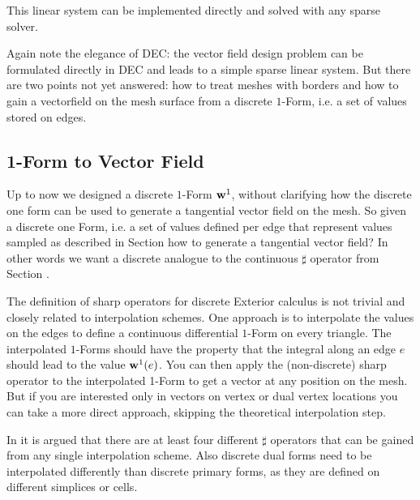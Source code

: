 This linear system can be implemented directly and solved with any sparse solver.

Again note the elegance of DEC: the vector field design problem can be formulated directly in DEC and leads to a simple sparse linear system. But there are two points not yet answered: how to treat meshes with borders and how to gain a vectorfield on the mesh surface from a discrete $1$-Form, i.e. a set of values stored on edges.

\subsection{1-Form to Vector Field}
Up to now we designed a discrete $1$-Form $\textbf{w}^1$, without clarifying how the discrete one form can be used to generate a tangential vector field on the mesh. So given a discrete one Form, i.e. a set of values defined per edge that represent values sampled as described in Section   how to generate a tangential vector field? In other words we want a discrete analogue to the continuous $\sharp$ operator from Section .

The definition of sharp operators for discrete Exterior calculus is not trivial and closely related to interpolation schemes. One approach is to interpolate the values on the edges to define a continuous differential $1$-Form on every triangle. The interpolated $1$-Forms should have the property that the integral along an edge $e$ should lead to the value $\textbf{w}^1(e)$. You can then apply the (non-discrete) sharp operator to the interpolated 1-Form to get a vector at any position on the mesh.
But if you are interested only in vectors on vertex or dual vertex locations you can take a more direct approach, skipping the theoretical interpolation step.

In \note{[Hirani]} it is argued that there are at least four different $\sharp$ operators that can be gained from any single interpolation scheme. Also discrete dual forms need to be interpolated differently than discrete primary forms, as they are defined on different simplices or cells. 

